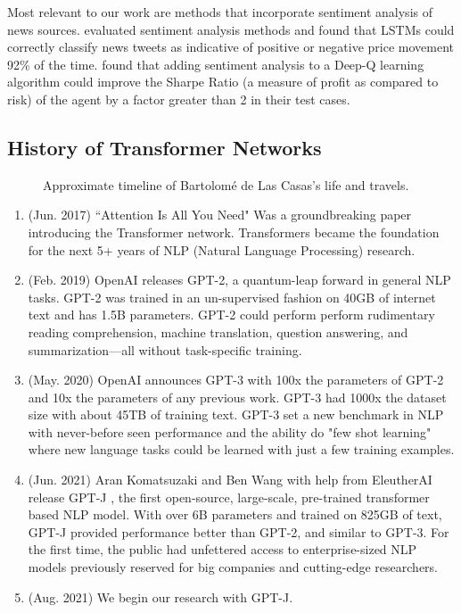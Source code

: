 \documentclass[conference]{IEEEtran}
\begin{document}
Most relevant to our work are methods that incorporate sentiment analysis of news sources. \cite{Mehta2021} evaluated sentiment analysis methods and found that LSTMs could correctly classify news tweets as indicative of positive or negative price movement 92\% of the time. \cite{Nan2020} found that adding sentiment analysis to a Deep-Q learning algorithm could improve the Sharpe Ratio (a measure of profit as compared to risk) of the agent by a factor greater than 2 in their test cases.

\subsection{History of Transformer Networks}
\begin{figure}[ht]
    \caption[Timeline]{Approximate timeline of Bartolomé de Las Casas's life and travels.}
\end{figure}
\begin{enumerate}
    \item (Jun. 2017) ``Attention Is All You Need" \cite{Vaswani2017} Was a groundbreaking paper introducing the Transformer network. Transformers became the foundation for the next 5+ years of NLP (Natural Language Processing) research.
    \item (Feb. 2019) OpenAI releases GPT-2, a quantum-leap forward in general NLP tasks. GPT-2 was trained in an un-supervised fashion on 40GB of internet text and has 1.5B parameters. GPT-2 could perform perform rudimentary reading comprehension, machine translation, question answering, and summarization—all without task-specific training.
    \item (May. 2020) OpenAI announces GPT-3\cite{Brown2020} with 100x the parameters of GPT-2 and 10x the parameters of any previous work. GPT-3 had 1000x the dataset size with about 45TB of training text. GPT-3 set a new benchmark in NLP with never-before seen performance and the ability do "few shot learning" where new language tasks could be learned with just a few training examples.
    \item (Jun. 2021) Aran Komatsuzaki and Ben Wang with help from EleutherAI release GPT-J \cite{mesh-transformer-jax}, the first open-source, large-scale, pre-trained transformer based NLP model. With over 6B parameters and trained on 825GB of text, GPT-J provided performance better than GPT-2, and similar to GPT-3. For the first time, the public had unfettered access to enterprise-sized NLP models previously reserved for big companies and cutting-edge researchers.
    \item (Aug. 2021) We begin our research with GPT-J.
\end{enumerate}
\end{document}
